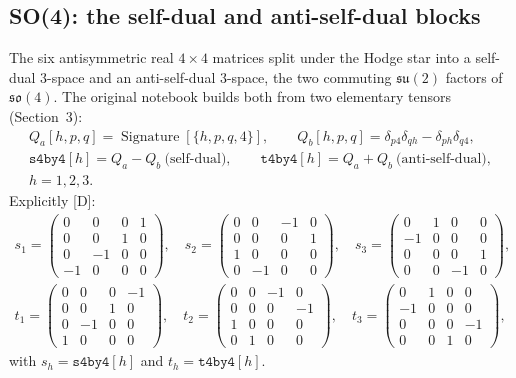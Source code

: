 \subsection{SO(4): the self-dual and anti-self-dual blocks}
\label{fnd:so4}\label{sec:2.3}

The six antisymmetric real $4\times4$ matrices split under the Hodge star into a self-dual
3-space and an anti-self-dual 3-space, the two commuting $\mathfrak{su}(2)$ factors of
$\mathfrak{so}(4)$. The original notebook builds both from two elementary tensors (Section~3):
\begin{gather}
  Q_a[h,p,q] = \operatorname{Signature}[\{h,p,q,4\}],\qquad
  Q_b[h,p,q] = \delta_{p4}\delta_{qh} - \delta_{ph}\delta_{q4},\\
  \texttt{s4by4}[h] = Q_a - Q_b \ \text{(self-dual)},\qquad
  \texttt{t4by4}[h] = Q_a + Q_b \ \text{(anti-self-dual)},\\
  h=1,2,3.
\end{gather}
Explicitly [D]:
\begin{gather*}
s_1=\left(\begin{smallmatrix}0&0&0&1\\0&0&1&0\\0&-1&0&0\\-1&0&0&0\end{smallmatrix}\right),\quad
s_2=\left(\begin{smallmatrix}0&0&-1&0\\0&0&0&1\\1&0&0&0\\0&-1&0&0\end{smallmatrix}\right),\quad
s_3=\left(\begin{smallmatrix}0&1&0&0\\-1&0&0&0\\0&0&0&1\\0&0&-1&0\end{smallmatrix}\right),\\
t_1=\left(\begin{smallmatrix}0&0&0&-1\\0&0&1&0\\0&-1&0&0\\1&0&0&0\end{smallmatrix}\right),\quad
t_2=\left(\begin{smallmatrix}0&0&-1&0\\0&0&0&-1\\1&0&0&0\\0&1&0&0\end{smallmatrix}\right),\quad
t_3=\left(\begin{smallmatrix}0&1&0&0\\-1&0&0&0\\0&0&0&-1\\0&0&1&0\end{smallmatrix}\right),
\end{gather*}
with $s_h = \texttt{s4by4}[h]$ and $t_h = \texttt{t4by4}[h]$.

